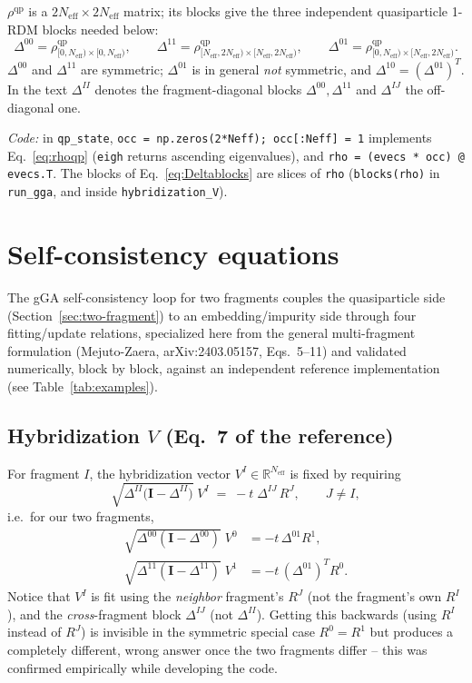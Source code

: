 \documentclass[11pt]{article}
\newcommand{\Neff}{N_{\mathrm{eff}}}
\begin{document}
$\rho^{\mathrm{qp}}$ is a $2\Neff\times2\Neff$ matrix; its blocks give the
three independent quasiparticle 1-RDM blocks needed below:
\begin{equation}
  \Delta^{00} = \rho^{\mathrm{qp}}_{[0,\Neff)\times[0,\Neff)},\qquad
  \Delta^{11} = \rho^{\mathrm{qp}}_{[\Neff,2\Neff)\times[\Neff,2\Neff)},\qquad
  \Delta^{01} = \rho^{\mathrm{qp}}_{[0,\Neff)\times[\Neff,2\Neff)} .
  \label{eq:Deltablocks}
\end{equation}
$\Delta^{00}$ and $\Delta^{11}$ are symmetric; $\Delta^{01}$ is in general
\emph{not} symmetric, and $\Delta^{10}=(\Delta^{01})^T$. In the text
$\Delta^{II}$ denotes the fragment-diagonal blocks $\Delta^{00},\Delta^{11}$
and $\Delta^{IJ}$ the off-diagonal one.

\emph{Code:} in \texttt{qp\_state}, \texttt{occ = np.zeros(2*Neff); occ[:Neff] = 1}
implements Eq.~\eqref{eq:rhoqp} (\texttt{eigh} returns ascending eigenvalues), and
\texttt{rho = (evecs * occ) @ evecs.T}.
The blocks of Eq.~\eqref{eq:Deltablocks} are slices of \texttt{rho}
(\texttt{blocks(rho)} in \texttt{run\_gga}, and inside
\texttt{hybridization\_V}).

\section{Self-consistency equations}
\label{sec:selfconsistency}

The gGA self-consistency loop for two fragments couples the quasiparticle side
(Section~\ref{sec:two-fragment}) to an embedding/impurity side through four
fitting/update relations, specialized here from the general multi-fragment
formulation (Mejuto-Zaera, arXiv:2403.05157, Eqs.~5--11) and validated
numerically, block by block, against an independent reference implementation
(see Table~\ref{tab:examples}).

\subsection{Hybridization $V$ (Eq.~7 of the reference)}
\label{sec:eqV}

For fragment $I$, the hybridization vector $V^{I}\in\mathbb R^{\Neff}$ is
fixed by requiring
\begin{equation}
  \sqrt{\Delta^{II}\bigl(\mathbf{I}-\Delta^{II}\bigr)}\;V^{I}
  \;=\; -t\;\Delta^{IJ}\,R^{J}, \qquad J\neq I ,
  \label{eq:eqV}
\end{equation}
i.e.\ for our two fragments,
\begin{align}
  \sqrt{\Delta^{00}(\mathbf{I}-\Delta^{00})}\;V^{0} &= -t\,\Delta^{01}R^{1}, \\
  \sqrt{\Delta^{11}(\mathbf{I}-\Delta^{11})}\;V^{1} &= -t\,(\Delta^{01})^{T}R^{0}.
\end{align}
Notice that $V^{I}$ is fit using the \emph{neighbor} fragment's $R^{J}$ (not
the fragment's own $R^{I}$), and the \emph{cross}-fragment block $\Delta^{IJ}$
(not $\Delta^{II}$). Getting this backwards (using $R^{I}$ instead of
$R^{J}$) is invisible in the symmetric special case $R^0=R^1$ but produces a
completely different, wrong answer once the two fragments differ -- this was
confirmed empirically while developing the code.
\end{document}

